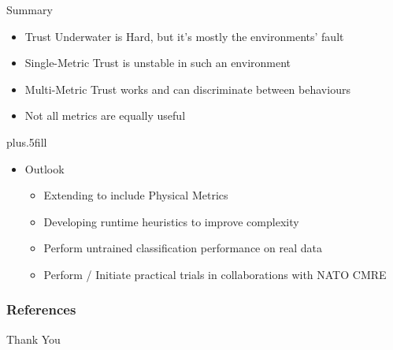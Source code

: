 \documentclass{beamer}
\begin{document}
\begin{frame}{Summary}
  \begin{itemize}
    \item Trust Underwater is \alert{Hard}, but it's mostly the environments' fault
    \item Single-Metric Trust is \alert{unstable} in such an environment
    \item Multi-Metric Trust works and can \alert{discriminate between behaviours}
    \item \alert{Not all metrics} are equally useful
  \end{itemize}
  
  \pause
  \vskip0pt plus.5fill
  \begin{itemize}
  \item
    Outlook
    \begin{itemize}
    \item Extending to include Physical Metrics
    \item Developing runtime heuristics to improve complexity
    \item Perform untrained classification performance on real data      
    \item Perform / Initiate practical trials in collaborations with NATO CMRE
    \end{itemize}
  \end{itemize}
\end{frame}

\begin{frame}[t,allowframebreaks]
  \frametitle{References}
  \printbibliography[title=References]%
\end{frame}

\begin{frame}
  \centerline{Thank You}
\end{frame}
\end{document}
